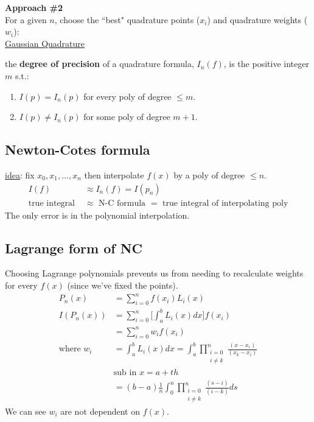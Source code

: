 \documentclass[12pt]{article}
\begin{document}
\textbf{Approach \#2}\\
For a given $n$, choose the ``best" quadrature points ($x_i$) and quadrature weights ($w_i$):\\
\underline{Gaussian Quadrature}

\vspace*{1em}
the \textbf{degree of precision} of a quadrature formula, $I_n(f)$, is the positive integer $m$ s.t.:
\begin{enumerate}
\item $I(p) = I_n(p)$ for every poly of degree $\leq m$.
\item $I(p) \neq I_n(p)$ for some poly of degree $m+1$.
\end{enumerate}
 
 
\subsection*{Newton-Cotes formula}
 
\underline{idea}: fix $x_0, x_1, \dots, x_n$ then interpolate $f(x)$ by a poly of degree $\leq n$.
%
\begin{align*}
I(f) &\approx I_n(f) = I(p_n)\\
\text{true integral } &\approx \text{ N-C formula } = \text{ true integral of interpolating poly}
\end{align*}
%
The only error is in the polynomial interpolation.

\subsection*{Lagrange form of NC}
Choosing Lagrange polynomials prevents us from needing to recalculate weights for every $f(x)$ (since we've fixed the points).
%
\begin{align*}
P_n(x) &= \sum_{i=0}^{n}f(x_i)L_i(x) \\
%
I(P_n(x)) &= \sum_{i=0}^{n} \bigl[ \int_a^b L_i(x)dx \bigr] f(x_i) \\
%
&= \sum_{i=0}^{n} w_i f(x_i)\\
\text{where } w_i &=  \int_a^b L_i(x)dx = \int_a^b \prod_{\substack{i=0\\ i \neq k}}^n \frac{(x-x_i)}{(x_k-x_i)} \\
&\text{sub in } x = a + th\\
&=  (b-a)\frac{1}{n}\int_0^n \prod_{\substack{i=0\\ i \neq k}}^n \frac{(s-i)}{(i-k)}ds
\end{align*}
We can see $w_i$ are not dependent on $f(x)$.
\end{document}
